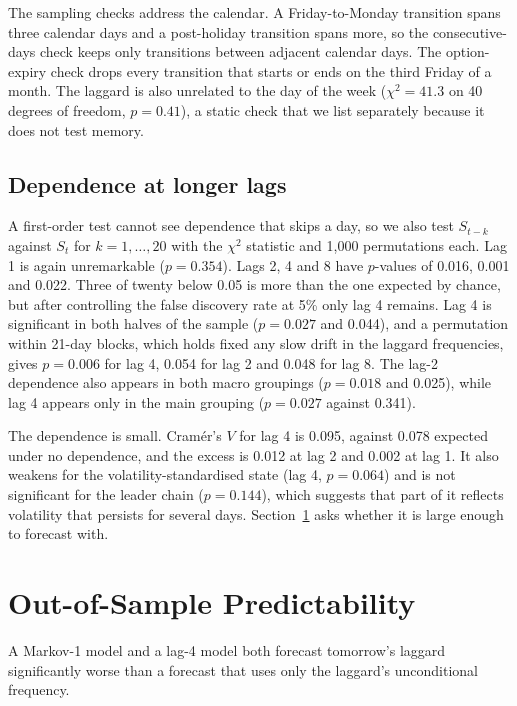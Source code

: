 \documentclass[11pt]{article}
\begin{document}
The sampling checks address the calendar. A Friday-to-Monday transition spans three calendar days and a post-holiday transition spans more, so the consecutive-days check keeps only transitions between adjacent calendar days. The option-expiry check drops every transition that starts or ends on the third Friday of a month. The laggard is also unrelated to the day of the week ($\chi^2 = 41.3$ on 40 degrees of freedom, $p = 0.41$), a static check that we list separately because it does not test memory.

\subsection{Dependence at longer lags}
\label{sec:lags}

A first-order test cannot see dependence that skips a day, so we also test $S_{t-k}$ against $S_t$ for $k = 1,\dots,20$ with the $\chi^2$ statistic and 1{,}000 permutations each. Lag 1 is again unremarkable ($p = 0.354$). Lags 2, 4 and 8 have $p$-values of 0.016, 0.001 and 0.022. Three of twenty below 0.05 is more than the one expected by chance, but after controlling the false discovery rate at 5\% \cite{benjaminihochberg1995} only lag 4 remains. Lag 4 is significant in both halves of the sample ($p = 0.027$ and 0.044), and a permutation within 21-day blocks, which holds fixed any slow drift in the laggard frequencies, gives $p = 0.006$ for lag 4, 0.054 for lag 2 and 0.048 for lag 8. The lag-2 dependence also appears in both macro groupings ($p = 0.018$ and 0.025), while lag 4 appears only in the main grouping ($p = 0.027$ against 0.341).

The dependence is small. Cram\'er's $V$ for lag 4 is 0.095, against 0.078 expected under no dependence, and the excess is 0.012 at lag 2 and 0.002 at lag 1. It also weakens for the volatility-standardised state (lag 4, $p = 0.064$) and is not significant for the leader chain ($p = 0.144$), which suggests that part of it reflects volatility that persists for several days. Section~\ref{sec:oos} asks whether it is large enough to forecast with.

\clearpage
\section{Out-of-Sample Predictability}
\label{sec:oos}

A Markov-1 model and a lag-4 model both forecast tomorrow's laggard significantly worse than a forecast that uses only the laggard's unconditional frequency.
\end{document}

